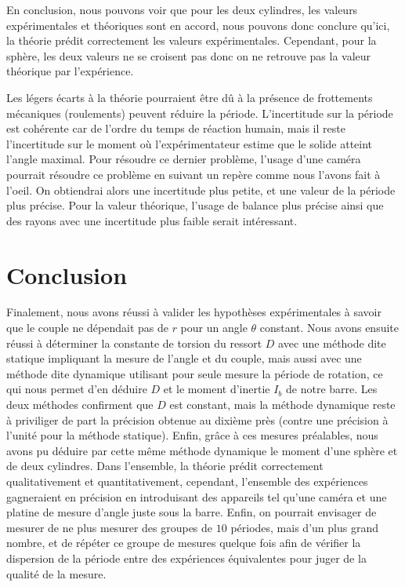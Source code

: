 \documentclass[11pt]{article}
\begin{document}
En conclusion, nous pouvons voir que pour les deux cylindres, les valeurs expérimentales et théoriques sont en accord, nous pouvons donc conclure qu'ici, la théorie prédit correctement
les valeurs expérimentales.
Cependant, pour la sphère, les deux valeurs ne se croisent pas donc on ne retrouve pas la valeur théorique par l'expérience.

Les légers écarts à la théorie pourraient être dû à la présence de frottements mécaniques (roulements) peuvent réduire la période. L'incertitude sur la période est cohérente car de l'ordre 
du temps de réaction humain, mais il reste l'incertitude sur le moment où l'expérimentateur estime que le solide atteint l'angle maximal. Pour résoudre ce dernier problème,
l'usage d'une caméra pourrait résoudre ce problème en suivant un repère comme nous l'avons fait à l'oeil. On obtiendrai alors une incertitude plus petite, et une
valeur de la période plus précise. Pour la valeur théorique, l'usage de balance plus précise ainsi que des rayons avec une incertitude plus faible serait intéressant.

\section{Conclusion}
Finalement, nous avons réussi à valider les hypothèses expérimentales à savoir que le couple ne dépendait pas de $r$ pour un angle $\theta$ constant. Nous avons
ensuite réussi à déterminer la constante de torsion du ressort $D$ avec une méthode dite statique impliquant la mesure de l'angle et du couple, mais aussi avec une méthode dite dynamique utilisant
pour seule mesure la période de rotation, ce qui nous permet d'en déduire $D$ et le moment d'inertie $I_b$ de notre barre. Les deux méthodes confirment que $D$ est constant, mais
la méthode dynamique reste à priviliger de part la précision obtenue au dixième près (contre une précision à l'unité pour la méthode statique). 
Enfin, grâce à ces mesures préalables, nous avons pu déduire par cette même méthode dynamique le moment d'une sphère et de deux cylindres.
Dans l'ensemble, la théorie prédit correctement qualitativement et quantitativement, cependant, l'ensemble des expériences gagneraient en précision 
en introduisant des appareils tel qu'une caméra et une platine de mesure d'angle juste sous la barre. Enfin, on pourrait envisager de mesurer
de ne plus mesurer des groupes de $10$ périodes, mais d'un plus grand nombre, et de répéter ce groupe de mesures quelque fois afin de vérifier
la dispersion de la période entre des expériences équivalentes pour juger de la qualité de la mesure.
\end{document}
